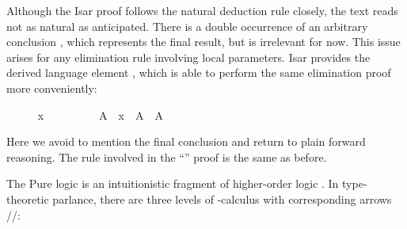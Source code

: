 \begin{isabellebody}
\begin{minipage}{0.4\textwidth}
\begin{isamarkuptext}
\end{isamarkuptext}%
\isamarkuptrue%
%
\end{minipage}
%
\begin{isamarkuptext}%
\medskip\noindent Although the Isar proof follows the natural
  deduction rule closely, the text reads not as natural as
  anticipated.  There is a double occurrence of an arbitrary
  conclusion , which represents the final result, but is
  irrelevant for now.  This issue arises for any elimination rule
  involving local parameters.  Isar provides the derived language
  element \hyperlink{command.obtain}{\mbox{}}, which is able to perform the same
  elimination proof more conveniently:%
\end{isamarkuptext}%
\isamarkuptrue%
%
\isadelimproof
\ \ \ \ %
\endisadelimproof
%
\isatagproof
{}\isamarkupfalse%
\ {\isachardoublequoteopen}x\ {\isasymin}\ {\isasymUnion}{\isasymA}{\isachardoublequoteclose}\isanewline
\ \ \ \ \isamarkupfalse%
\ \isamarkupfalse%
\ A\ \ {\isachardoublequoteopen}x\ {\isasymin}\ A{\isachardoublequoteclose}\ \ {\isachardoublequoteopen}A\ {\isasymin}\ {\isasymA}{\isachardoublequoteclose}\ \isacommand{{\isachardot}{\isachardot}}\isamarkupfalse%
%
\endisatagproof
{\isafoldproof}%
%
\isadelimproof
%
\endisadelimproof
%
\begin{isamarkuptext}%
\noindent Here we avoid to mention the final conclusion 
  and return to plain forward reasoning.  The rule involved in the
  ``\hyperlink{command.ddot}{\mbox{\isa{\isacommand{{\isachardot}{\isachardot}}}}}'' proof is the same as before.%
\end{isamarkuptext}%
\isamarkuptrue%
%
\isamarkuptrue%
%
\begin{isamarkuptext}%
The Pure logic \cite{paulson-found,paulson700} is an intuitionistic
  fragment of higher-order logic \cite{church40}.  In type-theoretic
  parlance, there are three levels of \isa{{\isachardoublequote}{\isasymlambda}{\isachardoublequote}}-calculus with
  corresponding arrows \isa{{\isachardoublequote}{\isasymRightarrow}{\isachardoublequote}}/\isa{{\isachardoublequote}{\isasymAnd}{\isachardoublequote}}/\isa{{\isachardoublequote}{\isasymLongrightarrow}{\isachardoublequote}}:


\end{isamarkuptext}
\end{isabellebody}
